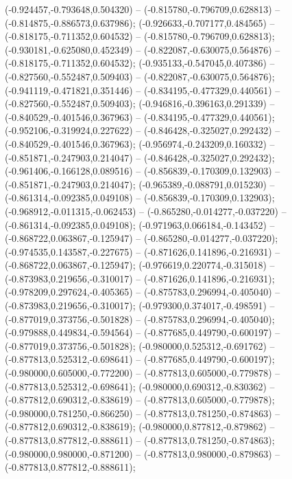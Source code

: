  (-0.924457,-0.793648,0.504320) -- (-0.815780,-0.796709,0.628813) -- (-0.814875,-0.886573,0.637986);
 (-0.926633,-0.707177,0.484565) -- (-0.818175,-0.711352,0.604532) -- (-0.815780,-0.796709,0.628813);
 (-0.930181,-0.625080,0.452349) -- (-0.822087,-0.630075,0.564876) -- (-0.818175,-0.711352,0.604532);
 (-0.935133,-0.547045,0.407386) -- (-0.827560,-0.552487,0.509403) -- (-0.822087,-0.630075,0.564876);
 (-0.941119,-0.471821,0.351446) -- (-0.834195,-0.477329,0.440561) -- (-0.827560,-0.552487,0.509403);
 (-0.946816,-0.396163,0.291339) -- (-0.840529,-0.401546,0.367963) -- (-0.834195,-0.477329,0.440561);
 (-0.952106,-0.319924,0.227622) -- (-0.846428,-0.325027,0.292432) -- (-0.840529,-0.401546,0.367963);
 (-0.956974,-0.243209,0.160332) -- (-0.851871,-0.247903,0.214047) -- (-0.846428,-0.325027,0.292432);
 (-0.961406,-0.166128,0.089516) -- (-0.856839,-0.170309,0.132903) -- (-0.851871,-0.247903,0.214047);
 (-0.965389,-0.088791,0.015230) -- (-0.861314,-0.092385,0.049108) -- (-0.856839,-0.170309,0.132903);
 (-0.968912,-0.011315,-0.062453) -- (-0.865280,-0.014277,-0.037220) -- (-0.861314,-0.092385,0.049108);
 (-0.971963,0.066184,-0.143452) -- (-0.868722,0.063867,-0.125947) -- (-0.865280,-0.014277,-0.037220);
 (-0.974535,0.143587,-0.227675) -- (-0.871626,0.141896,-0.216931) -- (-0.868722,0.063867,-0.125947);
 (-0.976619,0.220774,-0.315018) -- (-0.873983,0.219656,-0.310017) -- (-0.871626,0.141896,-0.216931);
 (-0.978209,0.297624,-0.405365) -- (-0.875783,0.296994,-0.405040) -- (-0.873983,0.219656,-0.310017);
 (-0.979300,0.374017,-0.498591) -- (-0.877019,0.373756,-0.501828) -- (-0.875783,0.296994,-0.405040);
 (-0.979888,0.449834,-0.594564) -- (-0.877685,0.449790,-0.600197) -- (-0.877019,0.373756,-0.501828);
 (-0.980000,0.525312,-0.691762) -- (-0.877813,0.525312,-0.698641) -- (-0.877685,0.449790,-0.600197);
 (-0.980000,0.605000,-0.772200) -- (-0.877813,0.605000,-0.779878) -- (-0.877813,0.525312,-0.698641);
 (-0.980000,0.690312,-0.830362) -- (-0.877812,0.690312,-0.838619) -- (-0.877813,0.605000,-0.779878);
 (-0.980000,0.781250,-0.866250) -- (-0.877813,0.781250,-0.874863) -- (-0.877812,0.690312,-0.838619);
 (-0.980000,0.877812,-0.879862) -- (-0.877813,0.877812,-0.888611) -- (-0.877813,0.781250,-0.874863);
 (-0.980000,0.980000,-0.871200) -- (-0.877813,0.980000,-0.879863) -- (-0.877813,0.877812,-0.888611);
